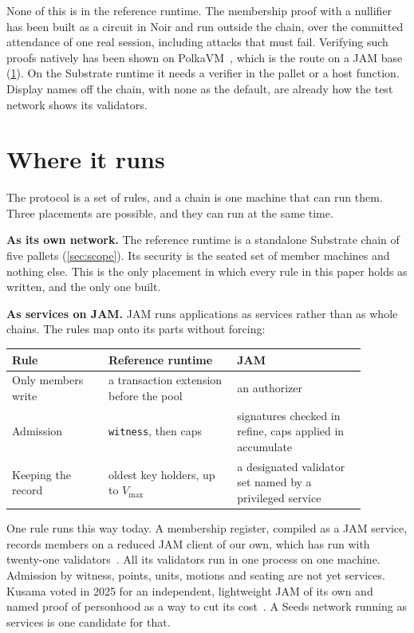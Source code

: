 \documentclass[11pt,a4paper]{article}
\theoremstyle{definition}
\theoremstyle{plain}
\theoremstyle{remark}
\begin{document}
None of this is in the reference runtime. The membership proof with a nullifier has been built as a circuit in Noir and run outside the chain, over the committed attendance of one real session, including attacks that must fail. Verifying such proofs natively has been shown on PolkaVM~\cite{noirverifier}, which is the route on a JAM base (\cref{sec:where}). On the Substrate runtime it needs a verifier in the pallet or a host function. Display names off the chain, with none as the default, are already how the test network shows its validators.

\section{Where it runs}
\label{sec:where}

The protocol is a set of rules, and a chain is one machine that can run them. Three placements are possible, and they can run at the same time.

\textbf{As its own network.} The reference runtime is a standalone Substrate chain of five pallets (\cref{sec:scope}). Its security is the seated set of member machines and nothing else. This is the only placement in which every rule in this paper holds as written, and the only one built.

\textbf{As services on JAM.} JAM runs applications as services rather than as whole chains. The rules map onto its parts without forcing:

\begin{center}
\small
\begin{tabular}{p{0.24\linewidth}p{0.32\linewidth}p{0.32\linewidth}}
\toprule
Rule & Reference runtime & JAM \\
\midrule
Only members write & a transaction extension before the pool & an authorizer \\
Admission & \texttt{witness}, then caps & signatures checked in refine, caps applied in accumulate \\
Keeping the record & oldest key holders, up to $V_{\max}$ & a designated validator set named by a privileged service \\
\bottomrule
\end{tabular}
\end{center}

\noindent One rule runs this way today. A membership register, compiled as a JAM service, records members on a reduced JAM client of our own, which has run with twenty-one validators~\cite{jambo}. All its validators run in one process on one machine. Admission by witness, points, units, motions and seating are not yet services. Kusama voted in 2025 for an independent, lightweight JAM of its own and named proof of personhood as a way to cut its cost~\cite{kusama573}. A Seeds network running as services is one candidate for that.
\end{document}

